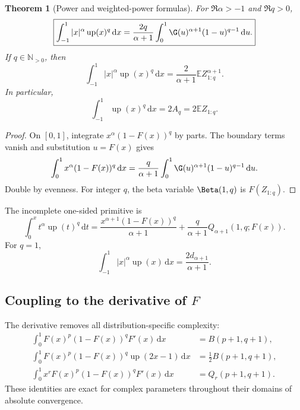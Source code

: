 \documentclass[11pt,oneside]{article}
\newtheorem{theorem}{Theorem}[section]
\theoremstyle{definition}
\theoremstyle{remark}
\newcommand{\F}{F}
\newcommand{\Up}{\operatorname{up}}
\newcommand{\E}{\mathbb E}
\newcommand{\N}{\mathbb N}
\newcommand{\dd}{\,\mathrm d}
\newcommand{\1}{\mathbf 1}
\begin{document}
\begin{theorem}[Power and weighted-power formulas\tagnew]\label{p12:thm:uppowers}
For \(\Re\alpha>-1\) and \(\Re q>0\),
\begin{equation}\label{p12:eq:uppower}
 \boxed{
 \int_{-1}^1|x|^\alpha\Up(x)^q\dd x
 =\frac{2q}{\alpha+1}
 \int_0^1\G(u)^{\alpha+1}(1-u)^{q-1}\dd u.}
\end{equation}
If \(q\in\N_{>0}\), then
\begin{equation}\label{p12:eq:upmin}
 \int_{-1}^1|x|^\alpha\Up(x)^q\dd x
 =\frac2{\alpha+1}\E Z_{1:q}^{\alpha+1}.
\end{equation}
In particular,
\begin{equation}\label{p12:eq:upLp}
 \int_{-1}^1\Up(x)^q\dd x=2A_q=2\E Z_{1:q}.
\end{equation}
\end{theorem}

\begin{proof}
On \([0,1]\), integrate \(x^\alpha(1-\F(x))^q\) by parts.  The boundary terms
vanish and substitution \(u=\F(x)\) gives
\[
 \int_0^1x^\alpha(1-\F(x))^q\dd x
 =\frac{q}{\alpha+1}\int_0^1\G(u)^{\alpha+1}(1-u)^{q-1}\dd u.
\]
Double by evenness.  For integer \(q\), the beta variable
\(\Beta(1,q)\) is \(\F(Z_{1:q})\).
\end{proof}

The incomplete one-sided primitive is
\begin{equation}\label{p12:eq:upincomplete}
 \int_0^x t^\alpha\Up(t)^q\dd t
 =\frac{x^{\alpha+1}(1-\F(x))^q}{\alpha+1}
 +\frac{q}{\alpha+1}Q_{\alpha+1}(1,q;\F(x)).
\end{equation}
For \(q=1\),
\begin{equation}
 \int_{-1}^1|x|^\alpha\Up(x)\dd x
 =\frac{2d_{\alpha+1}}{\alpha+1}.
\end{equation}

\subsection{Coupling to the derivative of \(\F\)}

The derivative removes all distribution-specific complexity:
\begin{align}
 \int_0^1\F(x)^p(1-\F(x))^q\F'(x)\dd x
 &=B(p+1,q+1),\label{p12:eq:Fprimebeta}\\
 \int_0^1\F(x)^p(1-\F(x))^q\Up(2x-1)\dd x
 &=\frac12B(p+1,q+1),\label{p12:eq:upcoupling}\\
 \int_0^1x^r\F(x)^p(1-\F(x))^q\F'(x)\dd x
 &=Q_r(p+1,q+1).\label{p12:eq:weightedFprime}
\end{align}
These identities are exact for complex parameters throughout their domains of
absolute convergence.
\end{document}
